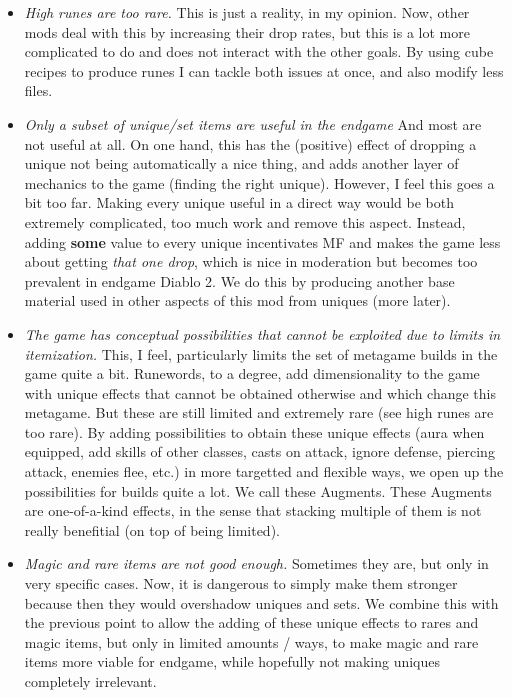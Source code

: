 \documentclass[12pt,a4paper]{article}
\begin{document}
\begin{itemize}

\item {\emph{High runes are too rare.}} This is just a reality, in my opinion. Now, other mods deal with this by increasing their drop rates, but this is a lot more complicated to do and does not interact with the other goals. By using cube recipes to produce runes I can tackle both issues at once, and also modify less files.

\item {\emph{Only a subset of unique/set items are useful in the endgame}} And most are not useful at all. On one hand, this has the (positive) effect of dropping a unique not being automatically a nice thing, and adds another layer of mechanics to the game (finding the right unique). However, I feel this goes a bit too far. Making every unique useful in a direct way would be both extremely complicated, too much work and remove this aspect. Instead, adding {\bf{some}} value to every unique incentivates MF and makes the game less about getting {\emph{that one drop}}, which is nice in moderation but becomes too prevalent in endgame Diablo 2. We do this by producing another base material used in other aspects of this mod from uniques (more later).

\item {\emph{The game has conceptual possibilities that cannot be exploited due to limits in itemization.}} This, I feel, particularly limits the set of metagame builds in the game quite a bit. Runewords, to a degree, add dimensionality to the game with unique effects that cannot be obtained otherwise and which change this metagame. But these are still limited and extremely rare (see high runes are too rare). By adding possibilities to obtain these unique effects (aura when equipped, add skills of other classes, casts on attack, ignore defense, piercing attack, enemies flee, etc.) in more targetted and flexible ways, we open up the possibilities for builds quite a lot. We call these Augments. These Augments are one-of-a-kind effects, in the sense that stacking multiple of them is not really benefitial (on top of being limited).

\item {\emph{Magic and rare items are not good enough.}} Sometimes they are, but only in very specific cases. Now, it is dangerous to simply make them stronger because then they would overshadow uniques and sets. We combine this with the previous point to allow the adding of these unique effects to rares and magic items, but only in limited amounts / ways, to make magic and rare items more viable for endgame, while hopefully not making uniques completely irrelevant. 


\end{itemize}
\end{document}
